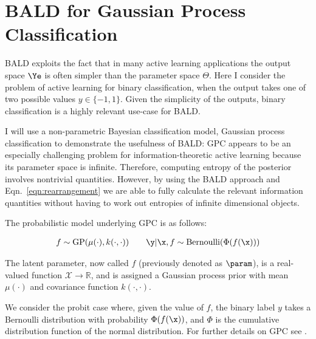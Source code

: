 
\section{BALD for Gaussian Process Classification}

BALD exploits the fact that in many active learning applications the output space $\Ye$ is often simpler than the parameter space $\Theta$. Here I consider the problem of active learning for binary classification, when the output takes one of two possible values $y \in \{-1,1\}$. Given the simplicity of the outputs, binary classification is a highly relevant use-case for BALD.

I will use a non-parametric Bayesian classification model, Gaussian process classification \citep[GPC,][]{Rasmussen2006} to demonstrate the usefulness of BALD: GPC appears to be an especially challenging problem for information-theoretic active learning because its parameter space is infinite. Therefore, computing entropy of the posterior involves nontrivial quantities. However, by using the BALD approach and Eqn.\ \eqref{eqn:rearrangement} we are able to fully calculate the relevant information quantities without having to work out entropies of infinite dimensional objects. 


The probabilistic model underlying GPC is as follows:

\begin{align}
	f \sim \mathrm{GP}(\mu(\cdot),k(\cdot,\cdot)) \qquad \y\vert\x,f \sim\mathrm{Bernoulli}(\Phi(f(\x))) \label{eqn:GPC_model}
\end{align}

The latent parameter, now called $f$ (previously denoted as $\param$), is a real-valued function $\mathcal{X}\rightarrow\mathbb{R}$, and is assigned a Gaussian process prior with mean $\mu(\cdot)$ and covariance function $k(\cdot,\cdot)$.


We consider the probit case where, given the value of $f$, the binary label $y$ takes a Bernoulli distribution with probability $\Phi(f(\x))$, and $\Phi$ is the cumulative distribution function of the normal distribution. For further details on GPC see \citep{Rasmussen2006}.

